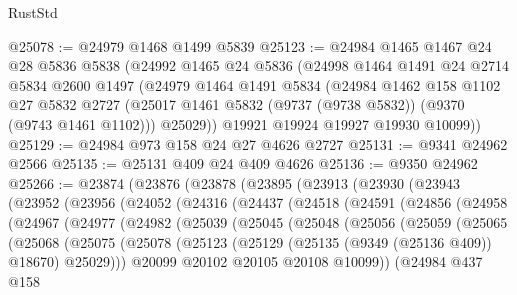 \begin{lexlean}{RustStd}
\begin{coremodule}
{\begin{coremodule}
{{{{{{{{{{{{{{{{{{{{{{{{{{{{{{{{{{{{{{{@25078 := @24979 @1468 @1499 @5839
@25123 := @24984
    @1465
    @1467
    @24
    @28
    @5836
    @5838
    (@24992
      @1465
      @24
      @5836
      (@24998
        @1464
        @1491
        @24
        @2714
        @5834
        @2600
        @1497
        (@24979
          @1464
          @1491
          @5834
          (@24984
            @1462
            @158
            @1102
            @27
            @5832
            @2727
            (@25017 @1461 @5832 (@9737 (@9738 @5832)) (@9370 (@9743 @1461 @1102)))
            @25029))
        @19921
        @19924
        @19927
        @19930
        @10099))
@25129 := @24984 @973 @158 @24 @27 @4626 @2727
@25131 := @9341 @24962 @2566
@25135 := @25131 @409 @24 @409 @4626
@25136 := @9350 @24962
@25266 := @23874
    (@23876
      (@23878
        (@23895
          (@23913
            (@23930
              (@23943
                (@23952
                  (@23956
                    (@24052
                      (@24316
                        (@24437
                          (@24518
                            (@24591
                              (@24856
                                (@24958
                                  (@24967
                                    (@24977
                                      (@24982
                                        (@25039
                                          (@25045
                                            (@25048
                                              (@25056
                                                (@25059
                                                  (@25065
                                                    (@25068
                                                      (@25075
                                                        (@25078
                                                          (@25123
                                                            (@25129
                                                              (@25135 (@9349 (@25136 @409)) @18670)
                                                              @25029)))
                                                        @20099
                                                        @20102
                                                        @20105
                                                        @20108
                                                        @10099))
                                                    (@24984
                                                      @437
                                                      @158
}}}}}}}}}}}}}}}}}}}}}}}}}}}}}}}}}}}}}}}
\end{coremodule}}
\end{coremodule}
\end{lexlean}
